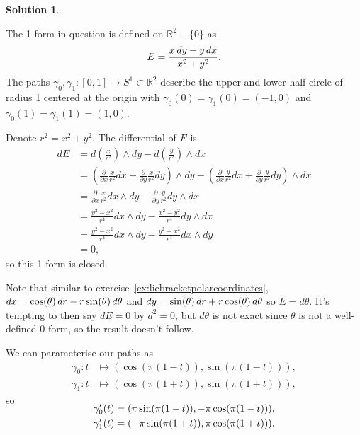 \documentclass[11pt, a4paper]{report}
\theoremstyle{definition}
\newtheorem{solution}{Solution}[part]
\newenvironment{sol}{\begin{solution}}{\end{solution}\pagebreak[3]}
\renewcommand*{\d}{\ensuremath\mathop{}\mathopen{}d}
\begin{document}
\begin{sol}\label{sol:closedbutpathdependent}

The 1-form in question is defined on $\mathbb{R}^2 - \{0\}$ as
\[
    E = \frac{x \d y - y \d x}{x^2 + y^2}.
\]
The paths $\gamma_0, \gamma_1 : [0, 1] \to S^1 \subset \mathbb{R}^2$ describe the upper and lower half circle of radius 1 centered at the origin with $\gamma_0(0) = \gamma_1(0) = (-1, 0)$ and $\gamma_0(1) = \gamma_1(1) = (1, 0)$.

Denote $r^2 = x^2 + y^2$. The differential of $E$ is
\begin{align*}
    dE &= d \left(\frac{x}{r^2}\right) \wedge dy
          - d \left(\frac{y}{r^2} \right)\wedge dx \\
       &= \left(\frac{\partial}{\partial x} \frac{x}{r^2} dx
                + \frac{\partial}{\partial y} \frac{x}{r^2} dy\right) \wedge dy
          - \left(\frac{\partial}{\partial x} \frac{y}{r^2} dx
                  + \frac{\partial}{\partial y} \frac{y}{r^2} dy\right) \wedge dx \\
       &= \frac{\partial}{\partial x} \frac{x}{r^2} dx \wedge dy
          - \frac{\partial}{\partial y} \frac{y}{r^2} dy \wedge dx \\
       &= \frac{y^2 - x^2}{r^4} dx \wedge dy - \frac{x^2 - y^2}{r^4} dy \wedge dx \\
       &= \frac{y^2 - x^2}{r^4} dx \wedge dy - \frac{y^2 - x^2}{r^4} dx \wedge dy \\
       &= 0,
\end{align*}
so this 1-form is closed.

Note that similar to exercise~\ref{ex:liebracketpolarcoordinates}, $dx = \cos(\theta) \d r - r \sin(\theta) \d \theta$ and $dy = \sin(\theta) \d r + r \cos(\theta) \d \theta$ so $E = d \theta$. It's tempting to then say $dE = 0$ by $d^2 = 0$, but $d\theta$ is not exact since $\theta$ is not a well-defined 0-form, so the result doesn't follow.

We can parameterise our paths as
\begin{align*}
    \gamma_0: t &\mapsto (\cos(\pi(1 - t)), \sin(\pi(1 - t))), \\
    \gamma_1: t &\mapsto (\cos(\pi(1 + t)), \sin(\pi(1 + t))),
\end{align*}
so
\begin{align*}
    \SwapAboveDisplaySkip
    \gamma_0'(t) &= (\pi \sin(\pi(1 - t)), -\pi \cos(\pi(1 - t))), \\
    \gamma_1'(t) &= (-\pi \sin(\pi(1 + t)), \pi \cos(\pi(1 + t))).
\end{align*}


\end{sol}
\end{document}
